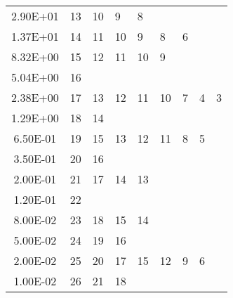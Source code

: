 \documentclass[11pt,letterpaper]{article}
\begin{document}
\begin{table}[htbp!]
\begin{tabular}{c|l|l|l|l|l|l|l|l}
  2.90E+01            & 13        & 10        & 9         & 8         &           &          &          &           \\ \cline{1-7}
  1.37E+01            & 14        & 11        & 10        & 9         & 8         & 6        &          &           \\ \cline{1-6}
  8.32E+00            & 15        & 12        & 11        & 10        & 9         &          &          &           \\ \cline{1-2}
  5.04E+00            & 16        &           &           &           &           &          &          &           \\ \hline
  2.38E+00            & 17        & 13        & 12        & 11        & 10        & 7        & 4        & 3         \\ \cline{1-3}
  1.29E+00            & 18        & 14        &           &           &           &          &          &           \\ \cline{1-8}
  6.50E-01            & 19        & 15        & 13        & 12        & 11        & 8        & 5        &           \\ \cline{1-3}
  3.50E-01            & 20        & 16        &           &           &           &          &          &           \\ \cline{1-5}
  2.00E-01            & 21        & 17        & 14        & 13        &           &          &          &           \\ \cline{1-2}
  1.20E-01            & 22        &           &           &           &           &          &          &           \\ \cline{1-5}
  8.00E-02            & 23        & 18        & 15        & 14        &           &          &          &           \\ \cline{1-4}
  5.00E-02            & 24        & 19        & 16        &           &           &          &          &           \\ \cline{1-8}
  2.00E-02            & 25        & 20        & 17        & 15        & 12        & 9        & 6        &           \\ \cline{1-4}
  1.00E-02            & 26        & 21        & 18        &           &           &          &          &           \\
  \bottomrule
  \end{tabular}
  \label{tab:energygroups}
\end{table}

\pagebreak


\end{document}
